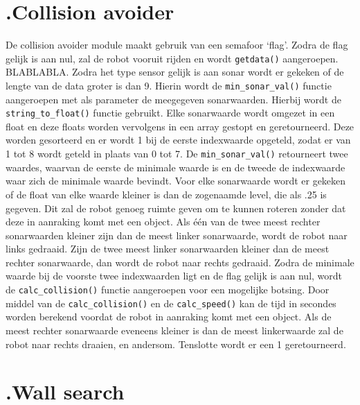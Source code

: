 \documentclass[a4paper,10pt]{article}
\begin{document}
\section*{\label{collisionavoider}\thesection.\quad Collision avoider}
De collision avoider module maakt gebruik van een semafoor `flag'. Zodra de flag gelijk is aan nul, zal de robot vooruit rijden en wordt \verb!getdata()! aangeroepen. BLABLABLA. Zodra het type sensor gelijk is aan sonar wordt er gekeken of de lengte van de data groter is dan 9. Hierin wordt de \verb!min_sonar_val()! functie aangeroepen met als parameter de meegegeven sonarwaarden. Hierbij wordt de \verb!string_to_float()! functie gebruikt. Elke sonarwaarde wordt omgezet in een float en deze floats worden vervolgens in een array gestopt en geretourneerd. Deze worden gesorteerd en er wordt 1 bij de eerste indexwaarde opgeteld, zodat er van 1 tot 8 wordt geteld in plaats van 0 tot 7. De \verb!min_sonar_val()! retourneert twee waardes, waarvan de eerste de minimale waarde is en de tweede de indexwaarde waar zich de minimale waarde bevindt.
Voor elke sonarwaarde wordt er gekeken of de float van elke waarde kleiner is dan de zogenaamde level, die als .25 is gegeven. Dit zal de robot genoeg ruimte geven om te kunnen roteren zonder dat deze in aanraking komt met een object. Als \'{e}\'{e}n van de twee meest rechter sonarwaarden kleiner zijn dan de meest linker sonarwaarde, wordt de robot naar links gedraaid. Zijn de twee meest linker sonarwaarden kleiner dan de meest rechter sonarwaarde, dan wordt de robot naar rechts gedraaid. Zodra de minimale waarde bij de voorste twee indexwaarden ligt en de flag gelijk is aan nul, wordt de \verb!calc_collision()! functie aangeroepen voor een mogelijke botsing. Door middel van de \verb!calc_collision()! en de \verb!calc_speed()! kan de tijd in secondes worden berekend voordat de robot in aanraking komt met een object. Als de meest rechter sonarwaarde eveneens kleiner is dan de meest linkerwaarde zal de robot naar rechts draaien, en andersom. Tenslotte wordt er een 1 geretourneerd.

\section*{\label{wallsearch}\thesection.\quad Wall search}
\end{document}
